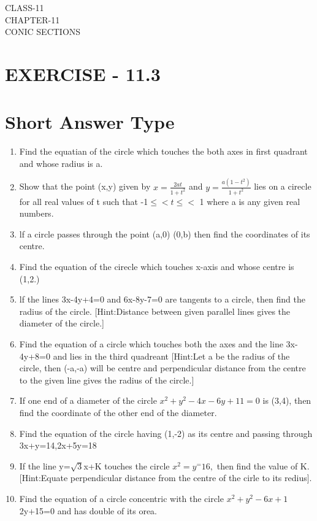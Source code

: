 \documentclass[12pt]{article}
\begin{document}
\begin{center}
\textbf\large{CLASS-11\\CHAPTER-11 \\ CONIC SECTIONS}
\end{center}

\section*{EXERCISE - 11.3}
\section*{Short Answer Type}
\begin{enumerate}
 \item Find the equatian of the circle which touches the both axes in first quadrant and whose radius is a.
 \item Show that the point (x,y) given by $x=\frac{2at}{1+t^2}$ and $y=\frac{a(1-t^2)}{1+t^2}$ lies on a cirecle for all real values of t such that -1$\le<t\le<$ 1 where a is any given real numbers. 
 \item lf a circle passes through the point (a,0) (0,b) then find the coordinates of its centre.
 \item Find the equation of the cirecle which touches x-axis and whose centre is (1,2.)
 \item lf the lines 3x-4y+4=0 and 6x-8y-7=0 are tangents to a circle, then find the radius of the circle.
 [Hint:Distance between given parallel lines gives the diameter of the circle.]
 \item Find the equation of a circle which touches  both the axes and the line 3x-4y+8=0 and lies in the third quadreant
 [Hint:Let a be the radius of the circle, then (-a,-a) will be centre and perpendicular distance from the centre to the given line gives the radius of the circle.]
 \item If one end of a diameter of the circle $x^2+y^2-4x-6y+11 =0$ is (3,4), then find the coordinate of the other end of the diameter.
 \item Find the equation of the circle having (1,-2) as its centre  and passing through 3x+y=14,2x+5y=18
 \item If the line y=$\sqrt{3}$x+K touches the circle $x^2=y^=16,$ then find the value of K.
 [Hint:Equate perpendicular distance from the centre of the cirle to its redius].
 \item Find the equation of a circle concentric with the circle $x^2+y^2-6x+1$2y+15=0 and has double of its orea.

\end{enumerate}
\end{document}
